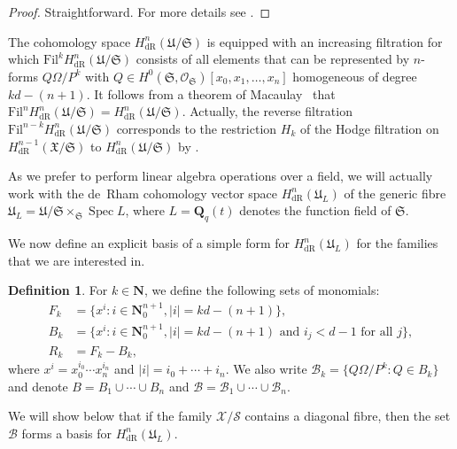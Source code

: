 \documentclass[a4paper,11pt]{article}
\numberwithin{equation}{section}
\providecommand{\abs}[1]{\lvert#1\rvert}                 %
\newcommand{\NN}{\mathbf{N}} %
\newcommand{\QQ}{\mathbf{Q}} %
\DeclareMathOperator{\Spec}{Spec}        %
\providecommand{\HdR}{H_{\text{dR}}}    %
\providecommand{\cB}{\mathcal{B}} %
\theoremstyle{definition}
\newtheorem{defn}[thm]{Definition}
\begin{document}
\begin{proof}
Straightforward. For more details see \cite{Griffiths1969}.
\end{proof}

The cohomology space $\HdR^{n}(\mathfrak{U}/\mathfrak{S})$ is equipped with 
an increasing filtration for which $\mbox{Fil}^k \HdR^{n}(\mathfrak{U}/\mathfrak{S})$ consists of 
all elements that can be represented by $n$-forms $Q \Omega / P^k$ 
with $Q \in H^0(\mathfrak{S},\mathcal{O}_{\mathfrak{S}})[x_0, x_1, \dotsc, x_n]$ homogeneous of degree $kd - (n + 1)$. 
It follows from a theorem of Macaulay~\citep[\S 4, (4.11)]{Griffiths1969} 
that $\mbox{Fil}^n \HdR^{n}(\mathfrak{U}/\mathfrak{S})= \HdR^{n}(\mathfrak{U}/\mathfrak{S})$. 
Actually, the reverse filtration $\mbox{Fil}^{n-k} \HdR^{n}(\mathfrak{U}/\mathfrak{S})$
corresponds to the restriction $H_k$ of the Hodge filtration on $\HdR^{n-1}(\mathfrak{X}/\mathfrak{S})$ 
to $\HdR^{n}(\mathfrak{U}/\mathfrak{S})$ by \cite{Griffiths1969}.

As we prefer to perform linear 
algebra operations over a field, we will actually work with the de~Rham 
cohomology vector space $\HdR^{n}(\mathfrak{U}_L)$ of the generic fibre 
$\mathfrak{U}_L = \mathfrak{U}/\mathfrak{S} \times_{\mathfrak{S}} \Spec{L}$, 
where $L=\QQ_q(t)$ denotes the function field of $\mathfrak{S}$. 

We now define an explicit 
basis of a simple form for $\HdR^{n}(\mathfrak{U}_L)$ for the families 
that we are interested in.

\begin{defn} \label{defn:MonBasis}
For $k \in \NN$, we define the following sets of monomials: 
\begin{align*}
F_k & = \{ x^i : i \in \mathbf{N}_{0}^{n+1}, \abs{i} = k d - (n+1) \}, \\
B_k & = \{ x^i : i \in \mathbf{N}_{0}^{n+1}, \abs{i} = k d - (n+1) \text{ and $i_j < d-1$ for all $j$}\}, \\
R_k & = F_k - B_k,
\end{align*}
where $x^i = x_0^{i_0} \dotsm x_n^{i_n}$ and $\abs{i} = i_0 + \dotsb + i_n$. 
We also write $\cB_k = \{Q \Omega / P^k : Q \in B_k\}$ and denote
$B = B_1 \cup \dotsb \cup B_n$ and $\cB = \cB_1 \cup \dotsb \cup \cB_n$.
\end{defn}

We will show below that if the family $\mathcal{X}/{\mathcal{S}}$ contains 
a diagonal fibre, then the set $\cB$ forms a basis for $\HdR^n(\mathfrak{U}_L)$.
\end{document}
